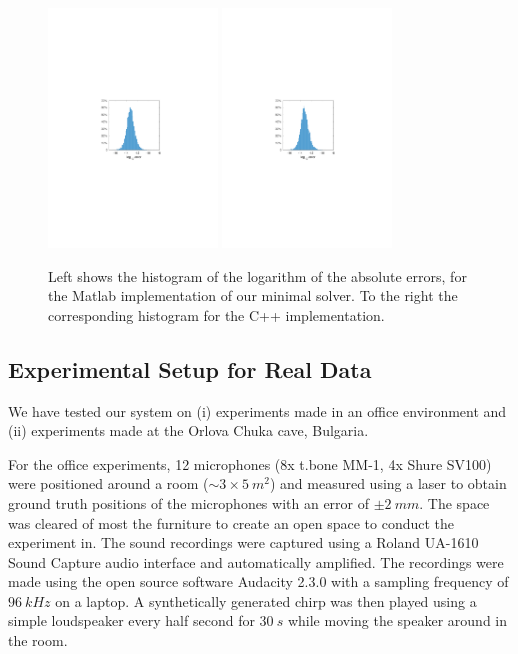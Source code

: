 \documentclass[
]{book}
\begin{document}
\begin{figure}
\includegraphics[width=0.4\textwidth]{original_papers/icassp_2018/figs/hist_matlabsolver.pdf}
\includegraphics[width=0.4\textwidth]{original_papers/icassp_2018/figs/hist_mexsolver.pdf}
\caption{Left shows the histogram of the logarithm of the absolute errors, for the Matlab implementation of our minimal solver. To the right the corresponding histogram for the C++ implementation.}
\label{fig:f_hist}
\end{figure}

\vspace{-5pt}
\subsection{Experimental Setup for Real Data}
\vspace{-5pt}

We have tested our system on (i) experiments made in an office environment and (ii) experiments made at the Orlova Chuka cave, Bulgaria.

For the office experiments, 12 microphones (8x t.bone MM-1, 4x Shure SV100) were positioned around a room (\(\sim 3 \times 5~m^2\)) and measured using a laser to obtain ground truth positions of the microphones with an error of \(\pm 2~ mm\). The space was cleared of most the furniture to create an open space to conduct the experiment in. The sound recordings were captured using a Roland UA-1610 Sound Capture audio interface and automatically amplified. The recordings were made using the open source software Audacity 2.3.0 with a sampling frequency of \(96~kHz\) on a laptop. A synthetically generated chirp was then played using a simple loudspeaker every half second for \(30~s\) while moving the speaker around in the room.
\end{document}
